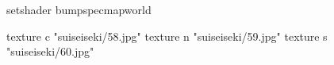 setshader bumpspecmapworld

    texture c "suiseiseki/58.jpg"
    texture n "suiseiseki/59.jpg"
    texture s "suiseiseki/60.jpg"
